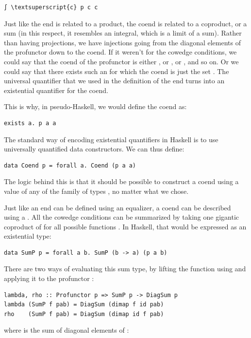 \begin{Verbatim}[commandchars=\\\{\}]
∫ \textsuperscript{c} p c c
\end{Verbatim}
Just like the end is related to a product, the coend is related to a
coproduct, or a sum (in this respect, it resembles an integral, which is
a limit of a sum). Rather than having projections, we have injections
going from the diagonal elements of the profunctor down to the coend. If
it weren't for the cowedge conditions, we could say that the coend of
the profunctor  is either , or
, or , and so on. Or we could say that
there exists such an  for which the coend is just the set
. The universal quantifier that we used in the
definition of the end turns into an existential quantifier for the
coend.

This is why, in pseudo-Haskell, we would define the coend as:

\begin{Verbatim}[commandchars=\\\{\}]
exists a. p a a
\end{Verbatim}
The standard way of encoding existential quantifiers in Haskell is to
use universally quantified data constructors. We can thus define:

\begin{Verbatim}[commandchars=\\\{\}]
data Coend p = forall a. Coend (p a a)
\end{Verbatim}
The logic behind this is that it should be possible to construct a coend
using a value of any of the family of types , no matter
what  we chose.

Just like an end can be defined using an equalizer, a coend can be
described using a . All the cowedge conditions can be
summarized by taking one gigantic coproduct of  for all
possible functions . In Haskell, that would be
expressed as an existential type:

\begin{Verbatim}[commandchars=\\\{\}]
data SumP p = forall a b. SumP (b -> a) (p a b)
\end{Verbatim}
There are two ways of evaluating this sum type, by lifting the function
using  and applying it to the profunctor :

\begin{Verbatim}[commandchars=\\\{\}]
lambda, rho :: Profunctor p => SumP p -> DiagSum p
lambda (SumP f pab) = DiagSum (dimap f id pab)
rho    (SumP f pab) = DiagSum (dimap id f pab)
\end{Verbatim}
where  is the sum of diagonal elements of :

